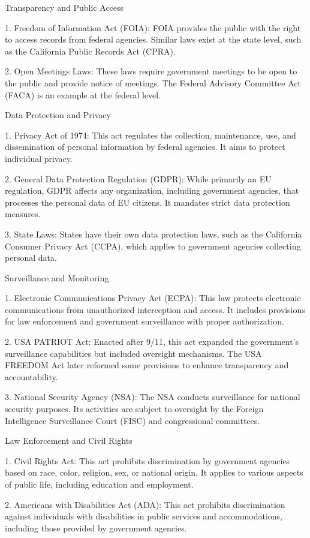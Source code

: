 \documentclass[12pt,letterpaper]{article}
\begin{document}
 Transparency and Public Access

1. Freedom of Information Act (FOIA): FOIA provides the public with the right to access records from federal agencies. Similar laws exist at the state level, such as the California Public Records Act (CPRA).

2. Open Meetings Laws: These laws require government meetings to be open to the public and provide notice of meetings. The Federal Advisory Committee Act (FACA) is an example at the federal level.

 Data Protection and Privacy

1. Privacy Act of 1974: This act regulates the collection, maintenance, use, and dissemination of personal information by federal agencies. It aims to protect individual privacy.

2. General Data Protection Regulation (GDPR): While primarily an EU regulation, GDPR affects any organization, including government agencies, that processes the personal data of EU citizens. It mandates strict data protection measures.

3. State Laws: States have their own data protection laws, such as the California Consumer Privacy Act (CCPA), which applies to government agencies collecting personal data.

 Surveillance and Monitoring

1. Electronic Communications Privacy Act (ECPA): This law protects electronic communications from unauthorized interception and access. It includes provisions for law enforcement and government surveillance with proper authorization.

2. USA PATRIOT Act: Enacted after 9/11, this act expanded the government's surveillance capabilities but included oversight mechanisms. The USA FREEDOM Act later reformed some provisions to enhance transparency and accountability.

3. National Security Agency (NSA): The NSA conducts surveillance for national security purposes. Its activities are subject to oversight by the Foreign Intelligence Surveillance Court (FISC) and congressional committees.

 Law Enforcement and Civil Rights

1. Civil Rights Act: This act prohibits discrimination by government agencies based on race, color, religion, sex, or national origin. It applies to various aspects of public life, including education and employment.

2. Americans with Disabilities Act (ADA): This act prohibits discrimination against individuals with disabilities in public services and accommodations, including those provided by government agencies.
\end{document}
